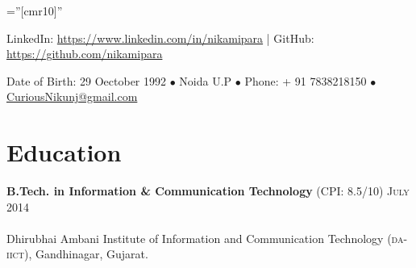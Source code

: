 \documentclass[letterpaper,11pt]{article}
\begin{document}
\pagestyle{empty} %

\font\fb=''[cmr10]'' %


\par{\par} %
\par{\centering LinkedIn: \href{https://www.linkedin.com/in/nikamipara}{https://www.linkedin.com/in/nikamipara} | GitHub: \href{https://github.com/nikamipara}{https://github.com/nikamipara}\par}
\par{\centering Date of Birth: 29 Oectober 1992 $\bullet$ Noida U.P $\bullet$ Phone: + 91 7838218150 $\bullet$ \href{mailto:curiousnikunj@gmail.com}{CuriousNikunj@gmail.com}\par  }

\section{Education}
\textbf{B.Tech. in Information \& Communication Technology} \normalsize (\textsc{CPI:} 8.5/10) \hfill{\textsc{July} 2014 }\\[-3mm]\\
\normalsize\small Dhirubhai Ambani Institute of Information and Communication Technology (\textsc{da-iict}), Gandhinagar, Gujarat.
\end{document}

